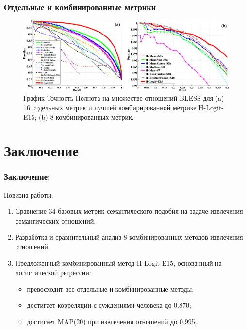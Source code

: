 \documentclass{beamer}
\begin{document}
\begin{frame}
\frametitle{ Отдельные и комбинированные метрики }


	\begin{figure}
	\centering
		\includegraphics[width=1.0\textwidth]{figures/pr}
		\caption{График Точность-Полнота на множестве отношений BLESS для (a) 16
                отдельных метрик и лучшей комбирированной метрике H-Logit-E15; (b) 8 комбинированных метрик.
}
\end{figure}
	
\end{frame}

\section{Заключение}


\begin{frame}
\frametitle{Заключение:}

\begin{block}{Новизна работы:}
\begin{enumerate}
\item Сравнение 34 базовых метрик семантического подобия на задаче извлечения семантических отношений.   
\item Разработка и сравнительный анализ 8 комбинированных методов извлечения отношений.
\item Предложенный комбинированный метод H-Logit-E15, основанный на логистической регрессии:
	\begin{itemize}
	\item превосходит все отдельные и комбинированные методы;
 	\item достигает корреляции с суждениями человека до 0.870;
 	\item достигает MAP(20) при извлечения отношений до 0.995.
	\end{itemize}   
\end{enumerate}
\end{block}

\end{frame}
\end{document}
